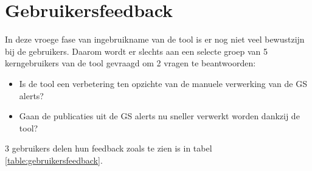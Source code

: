\section{Gebruikersfeedback}
\label{gebruikersfeedback}
In deze vroege fase van ingebruikname van de tool is er nog niet veel bewustzijn bij de gebruikers.
Daarom wordt er slechts aan een selecte groep van 5 kerngebruikers van de tool gevraagd om 2 vragen te beantwoorden:
\begin{itemize}
    \item Is de tool een verbetering ten opzichte van de manuele verwerking van de GS alerts?
    \item Gaan de publicaties uit de GS alerts nu sneller verwerkt worden dankzij de tool?
\end{itemize}
3 gebruikers delen hun feedback zoals te zien is in tabel \ref{table:gebruikersfeedback}.
